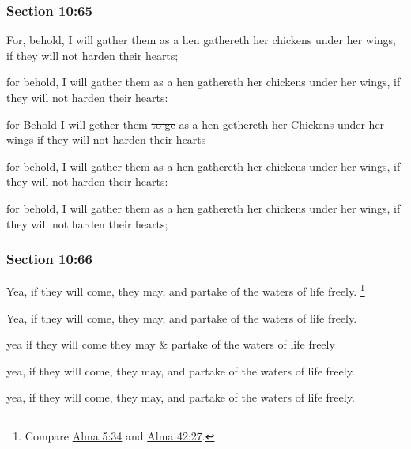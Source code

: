 	\subsubsection{Section 10:65} %
		\label{DC10-65}

		For, behold, I will gather them as a hen gathereth her chickens under her wings, if they will not harden their hearts;

		\begin{framed}
		\scriptsize
			\begin{compactdesc}
				\item[JSP] for behold, I will gather them as a hen gathereth her chickens under her wings, if they will not harden their hearts:
				\item[RB1] for Behold I will gether them \sout{to ge} as a hen gethereth her Chickens under her wings if they will not harden their hearts
				\item[DC 1835] for behold, I will gather them as a hen gathereth her chickens under her wings, if they will not harden their hearts:
				\item[DC 1844] for behold, I will gather them as a hen gathereth her chickens under her wings, if they will not harden their hearts; 
			\end{compactdesc}
		\end{framed}

	\subsubsection{Section 10:66} %
		\label{DC10-66}

		Yea, if they will come, they may, and partake of the waters of life freely.%
			\footnote{%
				Compare \hyperref[ALMA-5-34]{Alma 5:34} and \hyperref[ALMA-42-27]{Alma 42:27}.
				}

		\begin{framed}
		\scriptsize
			\begin{compactdesc}
				\item[JSP] Yea, if they will come, they may, and partake of the waters of life freely.
				\item[RB1] yea if they will come they may \& partake of the waters of life freely
				\item[DC 1835] yea, if they will come, they may, and partake of the waters of life freely.
				\item[DC 1844] yea, if they will come, they may, and partake of the waters of life freely.
			\end{compactdesc}
		\end{framed}

